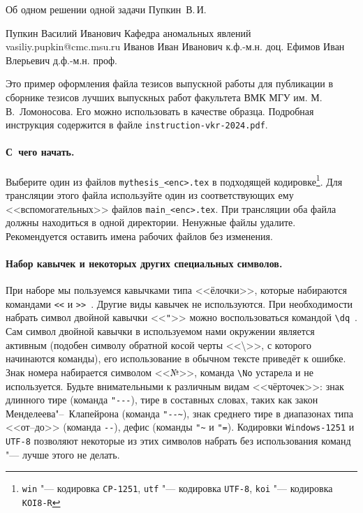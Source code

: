 \begin{vkrthesis}%
{Об одном решении одной задачи}%
{Пупкин~В.\,И.}%

\VKRAuthorDetailsSupervisorConsultant%
{Пупкин Василий Иванович}%
{Кафедра аномальных явлений}%
{vasiliy.pupkin@cmc.msu.ru}%
{Иванов Иван Иванович}%
{к.ф.-м.н.}%
{доц.}%
{Ефимов Иван Влерьевич}%
{д.ф.-м.н.}%
{проф.}%
{}%

\newcommand{\tbs}{\textbackslash}

Это пример оформления файла тезисов выпускной работы для публикации в сборнике
тезисов лучших выпускных работ факультета ВМК МГУ им. М.\,В.~Ломоносова.  Его
можно использовать в качестве образца.  Подробная инструкция содержится в файле
\texttt{instruction-vkr-2024.pdf}.

\paragraph{С~чего начать.}
Выберите один из файлов \texttt{mythesis\_<enc>.tex} в подходящей
кодировке\footnote{\texttt {win} "--- кодировка \texttt{CP-1251}, \texttt{utf}
"--- кодировка \texttt{UTF-8}, \texttt{koi} "--- кодировка \texttt{KOI8-R}}.
Для трансляции этого файла используйте один из соответствующих ему
<<вспомогательных>> файлов \texttt{main\_<enc>.tex}. При трансляции оба
файла должны находиться в одной директории. Ненужные файлы удалите.
Рекомендуется оставить имена рабочих файлов без изменения.

\begin{sloppypar}
\paragraph{Набор кавычек и некоторых других специальных символов.}
При наборе мы пользуемся кавычками типа <<ёлочки>>, которые набираются
командами \verb|<<| и \verb|>>|~. Другие виды кавычек не используются. При
необходимости набрать символ двойной кавычки <<\verb|"|>> можно воспользоваться
командой \verb|\dq|~. Сам символ двойной кавычки в используемом нами окружении
является активным (подобен символу обратной косой черты <<\tbs >>, с которого
начинаются команды), его использование в обычном тексте приведёт к ошибке.
Знак номера набирается символом <<№>>, команда \verb|\No| устарела и не
используется.  Будьте внимательными к различным видам <<чёрточек>>: знак
длинного тире (команда \verb|"---|), тире в составных словах, таких как закон
Менделеева"--~Клапейрона (команда \verb|"--~|), знак среднего тире в диапазонах
типа <<от--до>> (команда \verb|--|), дефис (команды \verb|"~| и \verb|"=|).
Кодировки \texttt{Windows-1251} и \texttt{UTF-8} позволяют некоторые из этих
символов набрать без использования команд "--- лучше этого не делать.
\end{sloppypar}


\end{vkrthesis}
